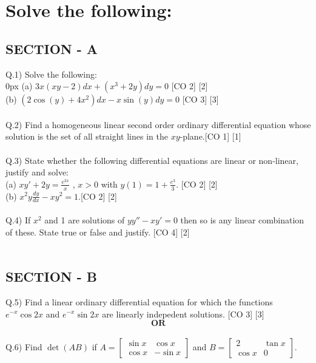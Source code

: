 \documentclass[12pt]{article}
\begin{document}
\section{Solve the following:}
\vspace{5mm}
\subsection{SECTION - A}
\vspace{4mm}
Q.1) Solve the following: \\[10pt]
\parindent 0px
(a) $3x(xy-2)dx + (x^3+2y)dy = 0$ \hfill [CO 2] [2] 
\\ [5pt]
(b) $(2\cos(y) + 4x^2)dx - x \sin(y) dy = 0$ \hfill [CO 3] [3]\\\\


Q.2) Find a homogeneous linear second order ordinary differential equation whose solution is the set of all straight lines in the $xy$-plane.\hfill [CO 1] [1] \\\\

Q.3) State whether the following differential equations are linear or non-linear, justify and solve: \\[10pt]
(a) $xy'+2y = \frac{e^{3x}}{x}$ , $x>0$ with  $y(1) = 1 + \frac{e^3}{3}$. \hfill [CO 2] [2]
\\[5pt]
(b) $x^2y\frac{dy}{dx} - xy^2 = 1$.\hfill [CO 2] [2]
\\\\
Q.4) If $x^2$ and 1 are solutions of $yy'' - xy' = 0$ then so is any linear combination of these. State true or false and justify. \hfill [CO 4] [2] \\\\


\subsection{SECTION - B}
\vspace{4mm}
Q.5) Find a linear ordinary differential equation for which the functions $e^{-x}\cos2x $ and $e^{-x}\sin2x$ are linearly indepedent solutions. \hfill [CO 3] [3]\\
$$\textbf{OR}$$\\
Q.6) Find $\det (AB)$ if  $A = \begin{bmatrix}
\sin x & \cos x \\ \cos x & -\sin x
\end{bmatrix}$  and  $B = \begin{bmatrix}
2 & \tan x \\ \cos x & 0
\end{bmatrix}$. 
\end{document}
